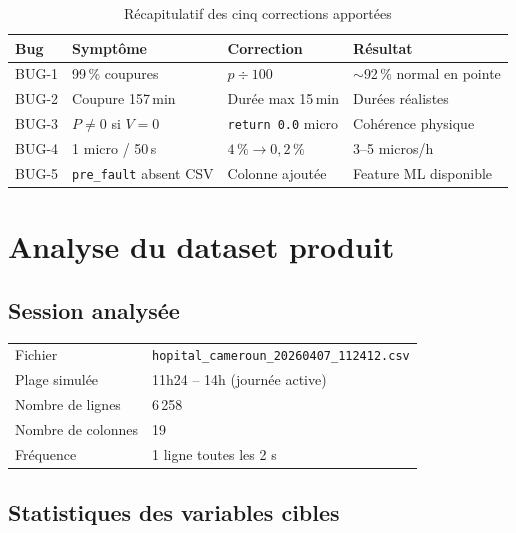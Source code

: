 \documentclass[12pt,a4paper]{article}
\begin{document}
\begin{table}[h]
\centering
\begin{tabular}{@{}llll@{}}
\toprule
Bug & Symptôme & Correction & Résultat \\
\midrule
BUG-1 & 99\,\% coupures & $p \div 100$ & $\sim$92\,\% normal en pointe \\
BUG-2 & Coupure 157\,min & Durée max 15\,min & Durées réalistes \\
BUG-3 & $P \neq 0$ si $V = 0$ & \texttt{return 0.0} micro & Cohérence physique \\
BUG-4 & 1 micro / 50\,s & $4\,\% \to 0{,}2\,\%$ & 3–5 micros/h \\
BUG-5 & \texttt{pre\_fault} absent CSV & Colonne ajoutée & Feature ML disponible \\
\bottomrule
\end{tabular}
\caption{Récapitulatif des cinq corrections apportées}
\end{table}

\section{Analyse du dataset produit}

\subsection{Session analysée}

\begin{tabular}{ll}
  Fichier & \texttt{hopital\_cameroun\_20260407\_112412.csv} \\
  Plage simulée & 11h24 – 14h (journée active) \\
  Nombre de lignes & 6\,258 \\
  Nombre de colonnes & 19 \\
  Fréquence & 1 ligne toutes les 2 s \\
\end{tabular}

\subsection{Statistiques des variables cibles}
\end{document}
